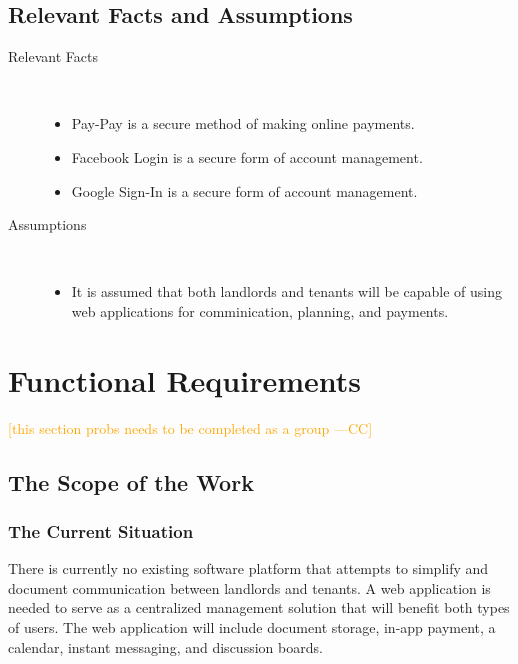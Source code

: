 \documentclass[12pt, titlepage]{article}
\newcommand{\authornote}[3]{\textcolor{#1}{[#3 ---#2]}}
\newcommand{\authornote}[3]{}
\newcommand{\cc}[1]{\authornote{orange}{CC}{#1}}
\begin{document}
\subsection{Relevant Facts and Assumptions} %
\begin{description}
  \item[Relevant Facts] \hfill \\
  \begin{itemize}
    \item Pay-Pay is a secure method of making online payments.
    \item Facebook Login is a secure form of account management.
    \item Google Sign-In is a secure form of account management.
  \end{itemize}
  \item[Assumptions] \hfill \\
  \begin{itemize}
  \item  It is assumed that both landlords and tenants will be capable of using
    web applications for comminication, planning, and payments.
  \end{itemize}
\end{description}  

\section{Functional Requirements} \cc{this section probs needs to be completed as a group}
\subsection{The Scope of the Work}
\subsubsection{The Current Situation}
There is currently no existing software platform that attempts to simplify and document communication between landlords and tenants. A web application is needed to serve as a centralized management solution that will benefit both types of users. The web application will include document storage, in-app payment, a calendar, instant messaging, and discussion boards.  
\end{document}
